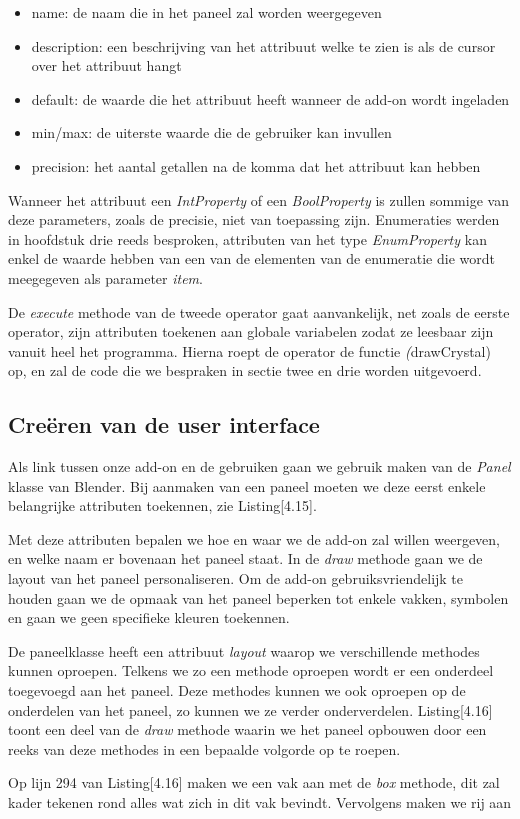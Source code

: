 \begin{itemize}
\item name: de naam die in het paneel zal worden weergegeven
\item description: een beschrijving van het attribuut welke te zien is als de cursor over het attribuut hangt
\item default: de waarde die het attribuut heeft wanneer de add-on wordt ingeladen
\item min/max: de uiterste waarde die de gebruiker kan invullen
\item precision: het aantal getallen na de komma dat het attribuut kan hebben
\end{itemize}  

Wanneer het attribuut een \textit{IntProperty} of een \textit{BoolProperty} is zullen sommige van deze parameters, zoals de precisie, niet van toepassing zijn. Enumeraties werden in hoofdstuk drie reeds besproken, attributen van het type \textit{EnumProperty} kan enkel de waarde hebben van een van de elementen van de enumeratie die wordt meegegeven als parameter \textit{item}.
\par
De \textit{execute} methode van de tweede operator gaat aanvankelijk, net zoals de eerste operator, zijn attributen toekenen aan globale variabelen zodat ze leesbaar zijn vanuit heel het programma. Hierna roept de operator de functie \textit(drawCrystal) op, en zal de code die we bespraken in sectie twee en drie  worden uitgevoerd.  

\subsection{Creëren van de user interface}
Als link tussen onze add-on en de gebruiken gaan we gebruik maken van de \textit{Panel} klasse van Blender. Bij aanmaken van een paneel moeten we deze eerst enkele belangrijke attributen toekennen, zie Listing[4.15].
 


Met deze attributen bepalen we hoe en waar we de add-on zal willen weergeven, en welke naam er bovenaan het paneel staat. In de \textit{draw} methode gaan we de layout van het paneel personaliseren. Om de add-on gebruiksvriendelijk te houden gaan we de opmaak van het paneel beperken tot enkele vakken, symbolen en gaan we geen specifieke kleuren toekennen.
\par
De paneelklasse heeft een attribuut \textit{layout} waarop we verschillende methodes kunnen oproepen. Telkens we zo een methode oproepen wordt er een onderdeel toegevoegd aan het paneel. Deze methodes kunnen we ook oproepen op de onderdelen van het paneel, zo kunnen we ze verder onderverdelen. Listing[4.16] toont een deel van de \textit{draw} methode waarin we het paneel opbouwen door een reeks van deze methodes in een bepaalde volgorde op te roepen. 



Op lijn 294 van Listing[4.16] maken we een vak aan met de \textit{box} methode, dit zal kader tekenen rond alles wat zich in dit vak bevindt. Vervolgens maken we rij aan 





